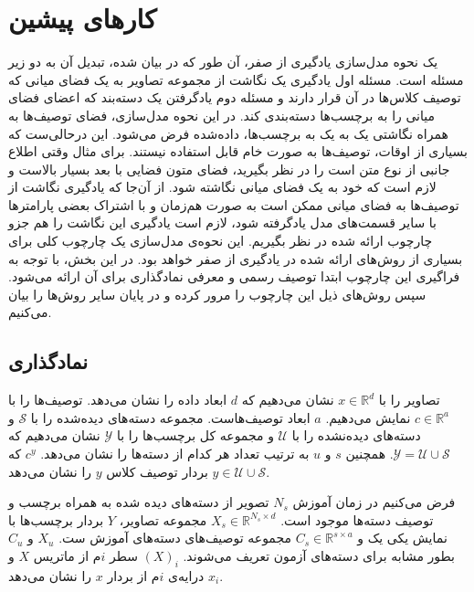 \section{کارهای پیشین}\label{review}
یک نحوه مدل‌سازی  یادگیری از صفر، آن طور که در \cite{hinton09} بیان شده، تبدیل آن به دو زیر مسئله است. مسئله اول یادگیری یک نگاشت از مجموعه تصاویر به یک فضای میانی که توصیف کلاس‌ها در آن قرار دارند و مسئله دوم یادگرفتن یک دسته‌بند که اعضای فضای میانی را به برچسب‌ها دسته‌بندی کند. در این نحوه مدل‌سازی، فضای توصیف‌ها به همراه نگاشتی یک به یک به برچسب‌ها، داده‌شده فرض می‌شود. این درحالی‌ست که بسیاری از اوقات، توصیف‌ها به صورت خام قابل استفاده نیستند. برای مثال وقتی اطلاع جانبی از نوع متن است را در نظر بگیرید، فضای متون فضایی با بعد بسیار بالاست و لازم است که خود به یک فضای میانی نگاشته شود. از آن‌جا که یادگیری نگاشت از توصیف‌ها به فضای میانی ممکن است به صورت هم‌زمان و با اشتراک بعضی پارامترها با سایر قسمت‌های مدل یادگرفته شود، لازم است یادگیری این نگاشت را هم جزو چارچوب ارائه شده در نظر بگیریم. این نحوه‌ی مدل‌سازی یک چارچوب کلی برای بسیاری از روش‌های ارائه شده در یادگیری از صفر خواهد بود. در این بخش، با توجه به فراگیری این چارچوب ابتدا توصیف رسمی و معرفی نمادگذاری برای آن ارائه می‌شود. سپس روش‌های ذیل این چارچوب را مرور کرده و در پایان سایر روش‌ها را بیان می‌کنیم. 
 
 
 \subsection{نماد‌گذاری}\label{notaion}
 تصاویر را با 
 $x \in \mathbb{R}^d$
 نشان می‌دهیم که $d$ ابعاد داده را نشان می‌دهد. توصیف‌ها را با 
 $ c \in \mathbb{R}^a$
 نمایش می‌دهیم. $a$ ابعاد توصیف‌هاست. مجموعه دسته‌های دیده‌شده را با  $ \mathcal{S}$ و دسته‌های دیده‌نشده را با $ \mathcal{U}$ و مجموعه کل برچسب‌ها را با $ \mathcal{Y}$ 
 نشان می‌دهیم که
 $ \mathcal{Y} =  \mathcal{U} \cup \mathcal{S} $.
 همچنین   $s$ و $u$ به ترتیب تعداد هر کدام از دسته‌ها را نشان می‌دهد. $c^y$ که    $ y \in \mathcal{U} \cup \mathcal{S} $ بردار توصیف کلاس $y$ را نشان می‌دهد.
   
    فرض می‌کنیم در زمان آموزش $N_s$ تصویر از دسته‌های دیده شده به همراه برچسب و  توصیف دسته‌ها موجود است. 
 $X_s \in \mathbb{R}^{N_s \times d}$
  مجموعه تصاویر، $Y$ بردار برچسب‌ها با نمایش یکی یک
   و 
  $C_s \in \mathbb{R}^{s \times a}$
 مجموعه توصیف‌های دسته‌های آموزش ست. $X_u$ و $C_u$ بطور مشابه برای دسته‌های آزمون تعریف می‌شوند. $(X)_i$ سطر $i$م از ماتریس $X$ و $x_i$ درایه‌ی $i$م از بردار $x$ را نشان می‌دهد. 
 
